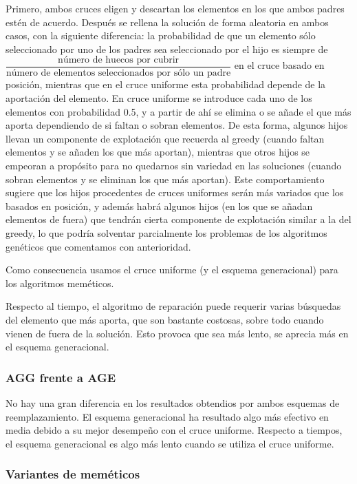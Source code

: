 \documentclass{article}
\begin{document}
Primero, ambos cruces eligen y descartan los elementos en los que ambos padres estén de acuerdo. Después se rellena la solución de
forma aleatoria en ambos casos, con la siguiente diferencia: la probabilidad de que un elemento sólo seleccionado por uno de los padres
sea seleccionado por el hijo es siempre de \\ $\dfrac{\text{número de huecos por cubrir}}{\text{número de elementos seleccionados por sólo un padre}}$ en el cruce basado en posición, mientras que en el cruce uniforme esta probabilidad depende de la aportación del elemento.
En cruce uniforme se introduce cada uno de los elementos con probabilidad 0.5, y a partir de ahí se elimina o se añade el que más aporta
dependiendo de si faltan o sobran elementos. De esta forma, algunos hijos llevan un componente de explotación que recuerda al greedy
 (cuando faltan elementos y se añaden los
que más aportan), mientras que otros hijos se empeoran a propósito para no quedarnos sin variedad en las soluciones (cuando sobran
 elementos y se eliminan los que más aportan). Este comportamiento sugiere que los hijos procedentes de cruces uniformes serán más
variados que los basados en posición, y además habrá algunos hijos (en los que se añadan elementos de fuera) que tendrán cierta
componente de explotación similar a la del greedy, lo que podría solventar parcialmente los problemas de los algoritmos genéticos que
comentamos con anterioridad.

Como consecuencia usamos el cruce uniforme (y el esquema generacional) para los algoritmos meméticos.

Respecto al tiempo, el algoritmo de reparación puede requerir varias búsquedas del elemento que más aporta, que son bastante costosas,
sobre todo cuando vienen de fuera de la solución. Esto provoca que sea más lento, se aprecia más en el esquema generacional.

\subsubsection*{AGG frente a AGE}

No hay una gran diferencia en los resultados obtendios por ambos esquemas de reemplazamiento. El esquema generacional ha resultado
algo más efectivo en media debido a su mejor desempeño con el cruce uniforme.
Respecto a tiempos, el esquema generacional es algo más lento cuando se utiliza el cruce uniforme. 

\subsubsection*{Variantes de meméticos}
\end{document}
